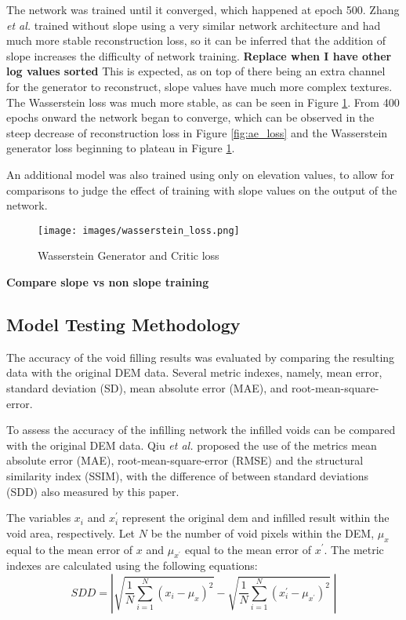\documentclass[twocolumn]{article}
\begin{document}
The network was trained until it converged, which happened at epoch 500.
Zhang \emph{et al.}\autocite{zhangVoidFillingBased2020} trained without slope using a very similar network architecture and had much more stable reconstruction loss, so it can be inferred that the addition of slope increases the difficulty of network training. \textbf{Replace when I have other log values sorted}
This is expected, as on top of there being an extra channel for the generator to reconstruct, slope values have much more complex textures.
The Wasserstein loss was much more stable, as can be seen in Figure \ref{fig:wasserstein_loss}.
From 400 epochs onward the network began to converge, which can be observed in the steep decrease of reconstruction loss in Figure \ref{fig:ae_loss} and the Wasserstein generator loss beginning to plateau in Figure \ref{fig:wasserstein_loss}.

An additional model was also trained using only on elevation values, to allow for comparisons to judge the effect of training with slope values on the output of the network.

\begin{figure}[htbp]
\centering
\texttt{[image: images/wasserstein\_loss.png]}
\caption{\label{fig:wasserstein_loss}Wasserstein Generator and Critic loss}
\end{figure}

\textbf{Compare slope vs non slope training}

\subsection{Model Testing Methodology}
\label{sec:orgd18c72c}

The accuracy of the void filling results was evaluated by comparing the resulting data with the original DEM data.
Several metric indexes, namely, mean error, standard deviation (SD), mean absolute error (MAE), and root-mean-square-error.

To assess the accuracy of the infilling network the infilled voids can be compared with the original DEM data.
Qiu \emph{et al.}\autocite{qiuVoidFillingDigital2019} proposed the use of the metrics mean absolute error (MAE), root-mean-square-error (RMSE) and the structural similarity index (SSIM)\autocite{wangImageQualityAssessment2004}, with the difference of between standard deviations (SDD) also measured by this paper.

The variables \(x_i\) and \(x^\prime_i\) represent the original dem and infilled result within the void area, respectively.
Let \(N\) be the number of void pixels within the DEM, \(\mu_x\) equal to the mean error of \(x\) and \(\mu_{x^\prime}\) equal to the mean error of \(x^\prime\).
The metric indexes are calculated using the following equations:
\begin{equation}
SDD = \left\lvert \sqrt{ \frac{1}{N} \sum_{i=1}^N (x_i - \mu_x)^2 }  -  \sqrt{\frac{1}{N} \sum_{i=1}^N (x^\prime_i - \mu_{x^\prime})^2} \; \right\rvert
\end{equation}
\end{document}
